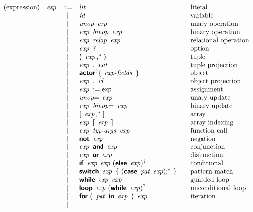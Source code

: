 $$
\begin{array}{@{}lrcl@{\qquad}l}
\text{(expression)} & \x{exp} &::=&
  \x{lit}
    & \text{literal} \\&&|&
  \x{id}
    & \text{variable} \\&&|&
  \x{unop}~\x{exp}
    & \text{unary operation} \\&&|&
  \x{exp}~\x{binop}~\x{exp}
    & \text{binary operation} \\&&|&
  \x{exp}~\x{relop}~\x{exp}
    & \text{relational operation} \\&&|&
  \x{exp}~\K?
    & \text{option} \\&&|&
  \K(~\x{exp}\K,^\ast~\K)
    & \text{tuple} \\&&|&
  \x{exp}~\K.~\x{nat}
    & \text{tuple projection} \\&&|&
  \KK{actor}^? \K\{~\x{exp-fields}~\K\}
    & \text{object} \\&&|&
  \x{exp}~\K.~\x{id}
    & \text{object projection} \\&&|&
  \x{exp}~\K{:=}~\K{exp}
    & \text{assignment} \\&&|&
  \x{unop}{\!\K=}~\x{exp}
    & \text{unary update} \\&&|&
  \x{exp}~\x{binop}{\!\K=}~\x{exp}
    & \text{binary update} \\&&|&
  \K[~\void{\KK{var}^?} \x{exp}\K,^\ast~\K]
    & \text{array} \\&&|&
  \x{exp}~\K[~\x{exp}~\K]
    & \text{array indexing} \\&&|&
  \x{exp}~\x{typ-args}~\x{exp}
    & \text{function call} \\&&|&
  \KK{not}~\x{exp}
    & \text{negation} \\&&|&
  \x{exp}~\KK{and}~\x{exp}
    & \text{conjunction} \\&&|&
  \x{exp}~\KK{or}~\x{exp}
    & \text{disjunction} \\&&|&
  \KK{if}~\x{exp}~\x{exp}~(\KK{else}~\x{exp})^?
    & \text{conditional} \\&&|&
  \KK{switch}~\x{exp}~\K\{~(\KK{case}~\x{pat}~\x{exp})\K;^\ast~\K\}
    & \text{pattern match} \\&&|&
  \KK{while}~\x{exp}~\x{exp}
    & \text{guarded loop} \\&&|&
  \KK{loop}~\x{exp}~(\KK{while}~\x{exp})^?
    & \text{unconditional loop} \\&&|&
  \KK{for}~\K(~\x{pat}~\KK{in}~\x{exp}~\K)~\x{exp}
    & \text{iteration} \\&&|&

\end{array}$$
